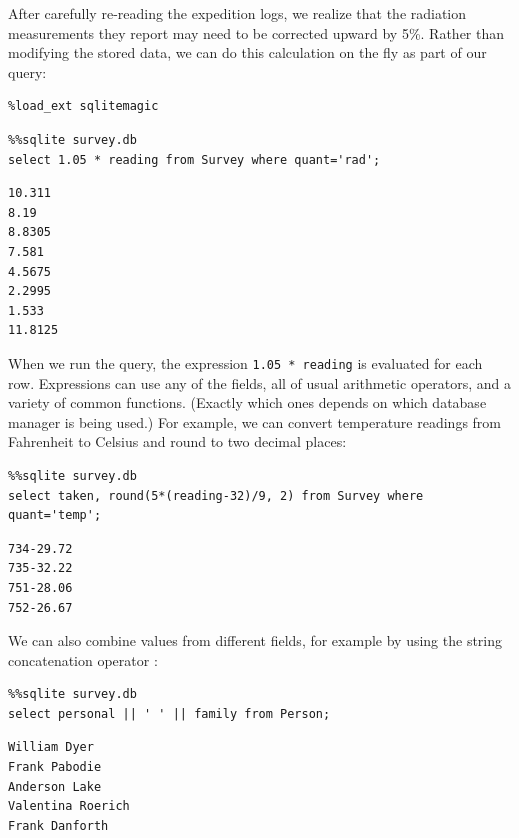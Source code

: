 \documentclass{book}
\begin{document}
After carefully re-reading the expedition logs, we realize that the
radiation measurements they report may need to be corrected upward by
5\%. Rather than modifying the stored data, we can do this calculation
on the fly as part of our query:

\begin{verbatim}
%load_ext sqlitemagic
\end{verbatim}

\begin{verbatim}
%%sqlite survey.db
select 1.05 * reading from Survey where quant='rad';
\end{verbatim}

\begin{verbatim}
10.311
8.19
8.8305
7.581
4.5675
2.2995
1.533
11.8125
\end{verbatim}

When we run the query, the expression \texttt{1.05 * reading} is
evaluated for each row. Expressions can use any of the fields, all of
usual arithmetic operators, and a variety of common functions. (Exactly
which ones depends on which database manager is being used.) For
example, we can convert temperature readings from Fahrenheit to Celsius
and round to two decimal places:

\begin{verbatim}
%%sqlite survey.db
select taken, round(5*(reading-32)/9, 2) from Survey where quant='temp';
\end{verbatim}

\begin{verbatim}
734-29.72
735-32.22
751-28.06
752-26.67
\end{verbatim}

We can also combine values from different fields, for example by using
the string concatenation operator \texttt{\textbar{}\textbar{}}:

\begin{verbatim}
%%sqlite survey.db
select personal || ' ' || family from Person;
\end{verbatim}

\begin{verbatim}
William Dyer
Frank Pabodie
Anderson Lake
Valentina Roerich
Frank Danforth
\end{verbatim}
\end{document}
